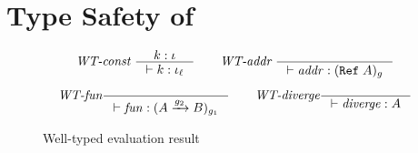 \section{Type Safety of \Surface}
\label{sec:surface-type-safety}

\begin{figure}[tbp]
  \raggedright
  \begin{gather*}
    \textit{WT-const}~
    \inference{k : \iota}{\vdash k : \iota_{\ell}}
    \qquad
    \textit{WT-addr}~
    \inference{}{\vdash \mathit{addr} : (\Refer{A})_{g}}
    \\[1ex]
    \textit{WT-fun}
    \inference{}{\vdash \mathit{fun} : (\Fun{A}{g_2}{B})_{g_1}}
    \qquad
    \textit{WT-diverge}
    \inference{}{\vdash \mathit{diverge} : A}
  \end{gather*}
  \caption{Well-typed evaluation result}
  \label{fig:wt-result}
\end{figure}

